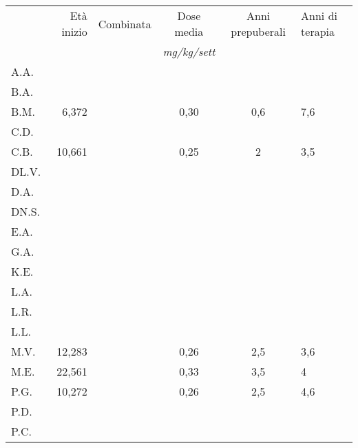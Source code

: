 \begin{table}[!h]
\begin{center}
\addtolength{\tabcolsep}{-1pt}
\renewcommand{\arraystretch}{1.1}
\begin{tabular}{lrcccl}
\toprule
 &        Età inizio & Combinata  & Dose media 	& Anni prepuberali & Anni di terapia \\
 &  &  				  & \emph{mg/kg/sett}	& & \\
\midrule
A.A.	&            & \checkmark &  		&                  &     \\
B.A.	&            &            &             &                  &     \\
B.M.	&  6,372     &            & 0,30        & 0,6              & 7,6 \\
C.D.	&            &            &             &                  &     \\
C.B.	& 10,661     & \checkmark & 0,25        & 2                & 3,5 \\
DL.V.	&            &            &             &                  &     \\
D.A.	&            &            &             &                  &     \\
DN.S.	&            &            &             &                  &     \\
E.A.	&            &            &             &                  &     \\
G.A.	&            &            &             &                  &     \\
K.E.	&            &            &             &                  &     \\
L.A.	&            &            &             &                  &     \\
L.R.	&            &            &             &                  &     \\
L.L.	&            &            &             &                  &     \\
M.V.	& 12,283     &            &  0,26       & 2,5              & 3,6 \\
M.E.	& 22,561     &            &  0,33       & 3,5              & 4   \\
P.G.	& 10,272     & \checkmark &  0,26       & 2,5              & 4,6 \\
P.D.	&            &            &             &                  &     \\
P.C.	&            &            &             &                  &     \\

\end{tabular}
\end{center}
\end{table}
